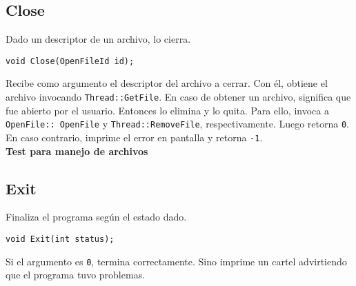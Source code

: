 \subsection*{Close}
Dado un descriptor de un archivo, lo cierra.\\
\begin{lstlisting}[style=C]
void Close(OpenFileId id);
\end{lstlisting}
Recibe como argumento el descriptor del archivo a cerrar. Con él, obtiene el archivo invocando \texttt{Thread::GetFile}. En caso de obtener un archivo, significa que fue abierto por el usuario. Entonces lo elimina y lo quita. Para ello, invoca a \texttt{OpenFile::~OpenFile} y \texttt{Thread::RemoveFile}, respectivamente. Luego retorna \texttt{0}.\\
En caso contrario, imprime el error en pantalla y retorna \texttt{-1}.\\
\textbf{Test para manejo de archivos}\\
\subsection*{Exit}
Finaliza el programa según el estado dado.
\begin{lstlisting}[style=C]
void Exit(int status);
\end{lstlisting}
Si el argumento es \texttt{0}, termina correctamente. Sino imprime un cartel advirtiendo que el programa tuvo problemas.

